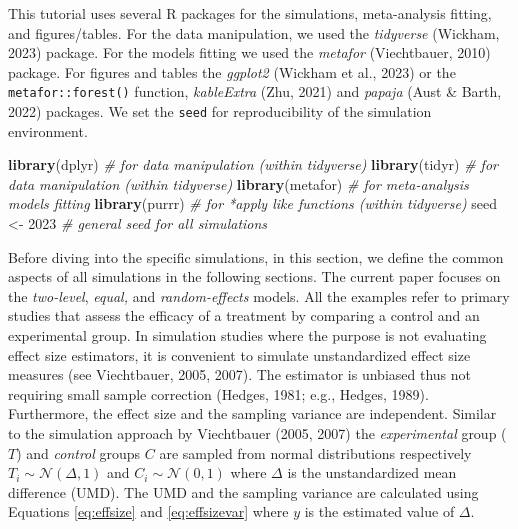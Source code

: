 \documentclass[
  man,floatsintext]{apa6}
\newenvironment{Shaded}{\begin{snugshade}}{\end{snugshade}}
\newcommand{\CommentTok}[1]{\textcolor[rgb]{0.56,0.35,0.01}{\textit{#1}}}
\newcommand{\DecValTok}[1]{\textcolor[rgb]{0.00,0.00,0.81}{#1}}
\newcommand{\FunctionTok}[1]{\textcolor[rgb]{0.13,0.29,0.53}{\textbf{#1}}}
\newcommand{\NormalTok}[1]{#1}
\newcommand{\OtherTok}[1]{\textcolor[rgb]{0.56,0.35,0.01}{#1}}
\begin{document}
This tutorial uses several R packages for the simulations, meta-analysis fitting, and figures/tables. For the data manipulation, we used the \emph{tidyverse} (Wickham, 2023) package. For the models fitting we used the \emph{metafor} (Viechtbauer, 2010) package. For figures and tables the \emph{ggplot2} (Wickham et al., 2023) or the \texttt{metafor::forest()} function, \emph{kableExtra} (Zhu, 2021) and \emph{papaja} (Aust \& Barth, 2022) packages. We set the \texttt{seed} for reproducibility of the simulation environment.

\scriptsize

\begin{Shaded}
\begin{Highlighting}[]
\FunctionTok{library}\NormalTok{(dplyr) }\CommentTok{\# for data manipulation (within tidyverse)}
\FunctionTok{library}\NormalTok{(tidyr) }\CommentTok{\# for data manipulation (within tidyverse)}
\FunctionTok{library}\NormalTok{(metafor) }\CommentTok{\# for meta{-}analysis models fitting}
\FunctionTok{library}\NormalTok{(purrr) }\CommentTok{\# for *apply like functions (within tidyverse)}
\NormalTok{seed }\OtherTok{\textless{}{-}} \DecValTok{2023} \CommentTok{\# general seed for all simulations}
\end{Highlighting}
\end{Shaded}

\normalsize

Before diving into the specific simulations, in this section, we define the common aspects of all simulations in the following sections. The current paper focuses on the \emph{two-level}, \emph{equal,} and \emph{random-effects} models. All the examples refer to primary studies that assess the efficacy of a treatment by comparing a control and an experimental group. In simulation studies where the purpose is not evaluating effect size estimators, it is convenient to simulate unstandardized effect size measures (see Viechtbauer, 2005, 2007). The estimator is unbiased thus not requiring small sample correction (Hedges, 1981; e.g., Hedges, 1989). Furthermore, the effect size and the sampling variance are independent. Similar to the simulation approach by Viechtbauer (2005, 2007) the \emph{experimental} group (\(T\)) and \emph{control} groups \(C\) are sampled from normal distributions respectively \(T_i \sim \mathcal{N}(\Delta, 1)\) and \(C_i \sim \mathcal{N}(0, 1)\) where \(\Delta\) is the unstandardized mean difference (UMD). The UMD and the sampling variance are calculated using Equations \eqref{eq:effsize} and \eqref{eq:effsizevar} where \(y\) is the estimated value of \(\Delta\).
\end{document}
